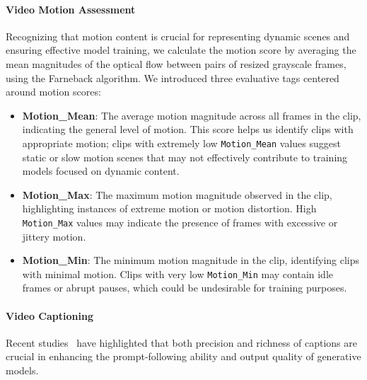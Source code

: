 \paragraph{Video Motion Assessment}

Recognizing that motion content is crucial for representing dynamic scenes and ensuring effective model training, we calculate the motion score by averaging the mean magnitudes of the optical flow \cite{opencv_library} between pairs of resized grayscale frames, using the Farneback algorithm. We introduced three evaluative tags centered around motion scores:


\begin{itemize}[left=0cm]
    \item \textbf{Motion\_Mean}: The average motion magnitude across all frames in the clip, indicating the general level of motion. This score helps us identify clips with appropriate motion; clips with extremely low \texttt{Motion\_Mean} values suggest static or slow motion scenes that may not effectively contribute to training models focused on dynamic content.

    \item \textbf{Motion\_Max}: The maximum motion magnitude observed in the clip, highlighting instances of extreme motion or motion distortion. High \texttt{Motion\_Max} values may indicate the presence of frames with excessive or jittery motion.

    \item \textbf{Motion\_Min}: The minimum motion magnitude in the clip, identifying clips with minimal motion. Clips with very low \texttt{Motion\_Min} may contain idle frames or abrupt pauses, which could be undesirable for training purposes.
\end{itemize}





\paragraph{Video Captioning} 
Recent studies~\citep{openaisora, betker2023improving} have highlighted that both precision and richness of captions are crucial in enhancing the prompt-following ability and output quality of generative models. 
 
